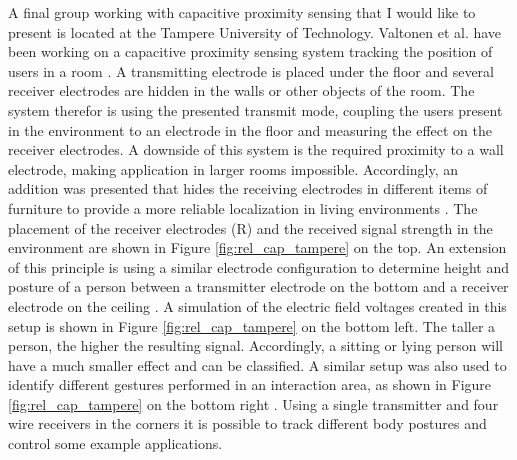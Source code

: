 A final group working with capacitive proximity sensing that I would like to present is located at the Tampere University of Technology. Valtonen et al. have been working on a capacitive proximity sensing system tracking the position of users in a room \cite{Valtonen2009a,valtonen2012capacitive}. A transmitting electrode is placed under the floor and several receiver electrodes are hidden in the walls or other objects of the room. The system therefor is using the presented transmit mode, coupling the users present in the environment to an electrode in the floor and measuring the effect on the receiver electrodes. A downside of this system is the required proximity to a wall electrode, making application in larger rooms impossible. Accordingly, an addition was presented that hides the receiving electrodes in different items of furniture to provide a more reliable localization in living environments \cite{valtonen2012capacitive}. The placement of the receiver electrodes (R) and the received signal strength in the environment are shown in Figure \ref{fig:rel_cap_tampere} on the top. An extension of this principle is using a similar electrode configuration to  determine height and posture of a person between a transmitter electrode on the bottom and a receiver electrode on the ceiling \cite{valtonen2011unobtrusive}. A simulation of the electric field voltages created in this setup is shown in Figure \ref{fig:rel_cap_tampere} on the bottom left. The taller a person, the higher the resulting signal. Accordingly, a sitting or lying person will have a much smaller effect and can be classified. A similar setup was also used to identify different gestures performed in an interaction area, as shown in Figure \ref{fig:rel_cap_tampere} on the bottom right \cite{valtonen2010human}. Using a single transmitter and four wire receivers in the corners it is possible to track different body postures and control some example applications.


